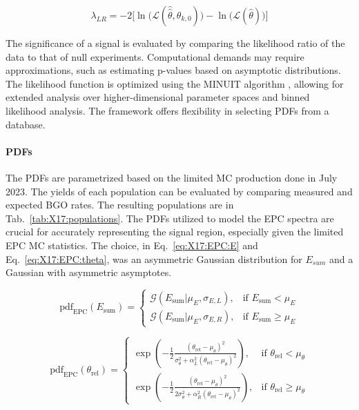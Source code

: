 \begin{refsection}
        \begin{equation}
        \label{eq:X17:LR}
            \lambda_{LR} = -2\biggl[\ln\bigl( \mathcal{L}(\hat{\hat{\theta}},\theta_{k,0}) \bigr) - \ln\bigl( \mathcal{L}(\hat{\theta}) \bigr)\biggr]
        \end{equation}
        
        \noindent
        The significance of a signal is evaluated by comparing the likelihood ratio of the data to that of null experiments. 
        Computational demands may require approximations, such as estimating p-values based on asymptotic distributions. 
        The likelihood function is optimized using the MINUIT algorithm \cite{MINUIT}\cite{MINUIT:manual}, allowing for extended analysis over higher-dimensional parameter spaces and binned likelihood analysis. 
        The framework offers flexibility in selecting PDFs from a database.


        
        \paragraph{PDFs}
        The PDFs are parametrized based on the limited MC production done in July 2023.
        The yields of each population can be evaluated by comparing measured and expected BGO rates. 
        The resulting populations are in Tab.~\ref{tab:X17:populations}.
        The PDFs utilized to model the EPC spectra are crucial for accurately representing the signal region, especially given the limited EPC MC statistics.
        The choice, in Eq.~\ref{eq:X17:EPC:E} and Eq.~\ref{eq:X17:EPC:theta}, was an asymmetric Gaussian distribution for $E_{sum}$ and a Gaussian with asymmetric asymptotes.

        \begin{equation}
        \label{eq:X17:EPC:E}
            \text{pdf}_{\text{EPC}}(E_{\text{sum}}) = 
            \begin{cases}
                \mathcal{G}(E_{\text{sum}} | \mu_E, \sigma_{E,L}), & \text{if } E_{\text{sum}} < \mu_E \\
                \mathcal{G}(E_{\text{sum}} | \mu_E, \sigma_{E,R}), & \text{if } E_{\text{sum}} \geq \mu_E
            \end{cases}
        \end{equation}

        \begin{equation}
        \label{eq:X17:EPC:theta}
            \text{pdf}_{\text{EPC}}(\theta_{\text{rel}}) = 
            \begin{cases}
                \exp\left(-\frac{1}{2} \frac{(\theta_{\text{rel}} - \mu_{\theta})^2}{\sigma_{\theta}^2+\alpha_L^2(\theta_{\text{rel}} - \mu_{\theta})^2}\right), & \text{if } \theta_{\text{rel}} < \mu_{\theta} \\
                \exp\left(-\frac{1}{2} \frac{(\theta_{\text{rel}} - \mu_{\theta})^2}{2\sigma_{\theta}^2+\alpha_R^2(\theta_{\text{rel}} - \mu_{\theta})^2}\right), & \text{if } \theta_{\text{rel}} \geq \mu_{\theta} 
            \end{cases}
        \end{equation}


\end{refsection}

